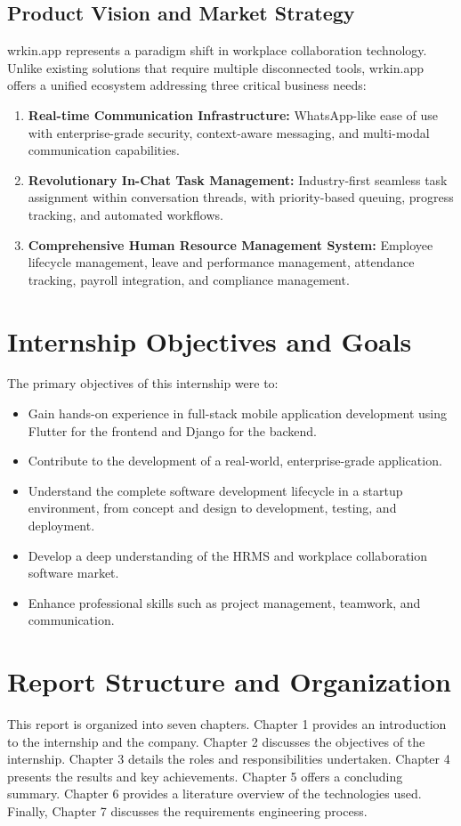 \subsection{Product Vision and Market Strategy}
wrkin.app represents a paradigm shift in workplace collaboration technology. Unlike existing solutions that require multiple disconnected tools, wrkin.app offers a unified ecosystem addressing three critical business needs:
\begin{enumerate}
    \item \textbf{Real-time Communication Infrastructure:} WhatsApp-like ease of use with enterprise-grade security, context-aware messaging, and multi-modal communication capabilities.
    \item \textbf{Revolutionary In-Chat Task Management:} Industry-first seamless task assignment within conversation threads, with priority-based queuing, progress tracking, and automated workflows.
    \item \textbf{Comprehensive Human Resource Management System:} Employee lifecycle management, leave and performance management, attendance tracking, payroll integration, and compliance management.
\end{enumerate}

\section{Internship Objectives and Goals}
The primary objectives of this internship were to:
\begin{itemize}
    \item Gain hands-on experience in full-stack mobile application development using Flutter for the frontend and Django for the backend.
    \item Contribute to the development of a real-world, enterprise-grade application.
    \item Understand the complete software development lifecycle in a startup environment, from concept and design to development, testing, and deployment.
    \item Develop a deep understanding of the HRMS and workplace collaboration software market.
    \item Enhance professional skills such as project management, teamwork, and communication.
\end{itemize}

\section{Report Structure and Organization}
This report is organized into seven chapters. Chapter 1 provides an introduction to the internship and the company. Chapter 2 discusses the objectives of the internship. Chapter 3 details the roles and responsibilities undertaken. Chapter 4 presents the results and key achievements. Chapter 5 offers a concluding summary. Chapter 6 provides a literature overview of the technologies used. Finally, Chapter 7 discusses the requirements engineering process.

